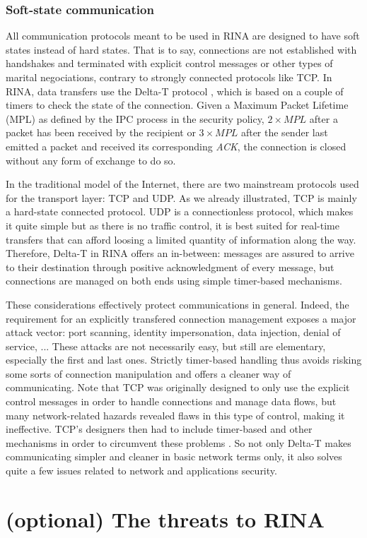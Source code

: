 \documentclass[a4paper]{proc}
\begin{document}
\section{Soft-state communication}

\par All communication protocols meant to be used in RINA are designed to have
soft states instead of hard states. That is to say, connections are not
established with handshakes and terminated with explicit control messages or
other types of marital negociations, contrary to strongly connected protocols
like TCP. In RINA, data transfers use the Delta-T protocol \cite{delta-t}, which
is based on a couple of timers to check the state of the connection. Given a
Maximum Packet Lifetime (MPL) as defined by the IPC process in the security
policy, $2 \times MPL$ after a packet has been received by the recipient or $3
\times MPL$ after the sender last emitted a packet and received its
corresponding \textit{ACK}, the connection is closed without any form of
exchange to do so.

\par In the traditional model of the Internet, there are two mainstream
protocols used for the transport layer: TCP and UDP. As we already illustrated,
TCP is mainly a hard-state connected protocol. UDP is a connectionless protocol,
which makes it quite simple but as there is no traffic control, it is best
suited for real-time transfers that can afford loosing a limited quantity of
information along the way. Therefore, Delta-T in RINA offers an in-between:
messages are assured to arrive to their destination through positive
acknowledgment of every message, but connections are managed on both ends using
simple timer-based mechanisms.

\par These considerations effectively protect communications in general. Indeed,
the requirement for an explicitly transfered connection management exposes a
major attack vector: port scanning, identity impersonation, data injection,
denial of service, ... These attacks are not necessarily easy, but still are
elementary, especially the first and last ones. Strictly timer-based handling
thus avoids risking some sorts of connection manipulation and offers a cleaner
way of communicating. Note that TCP was originally designed to only use the
explicit control messages in order to handle connections and manage data flows,
but many network-related hazards revealed flaws in this type of control, making
it ineffective. TCP's designers then had to include timer-based and other
mechanisms in order to circumvent these problems \cite{delta-t}. So not only
Delta-T makes communicating simpler and cleaner in basic network terms only, it
also solves quite a few issues related to network and applications security.

\part{(optional) The threats to RINA}

\nocite{*}
\newpage


\end{document}
